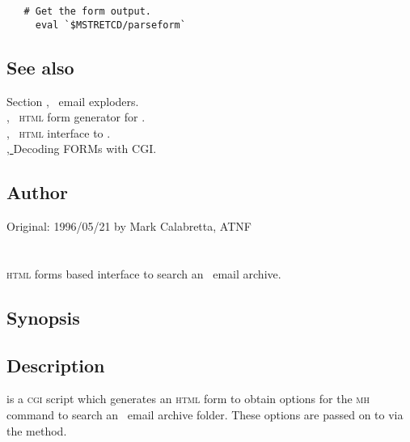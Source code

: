 \begin{verbatim}
   # Get the form output.
     eval `$MSTRETCD/parseform`
\end{verbatim}
 
\subsection*{See also}
 
Section , \aipspp\ email exploders.\\
, \aipspp\ \textsc{html} form generator for .\\
, \aipspp\ \textsc{html} interface to .\\
\href{http://hoohoo.ncsa.uiuc.edu/cgi/forms.html}{, }
   {Decoding FORMs with CGI}.
 
\subsection*{Author}
 
Original: 1996/05/21 by Mark Calabretta, ATNF


\newpage
\section{}
\label{pickhtml}

\textsc{html} forms based interface to search an \aipspp\ email archive.

\subsection*{Synopsis}

\begin{synopsis}
\end{synopsis}

\subsection*{Description}

 is a \textsc{cgi} script which generates an \textsc{html} form
to obtain options for the \textsc{mh}  command to search an
\aipspp\ email archive folder.  These options are passed on to
 via the  method.


